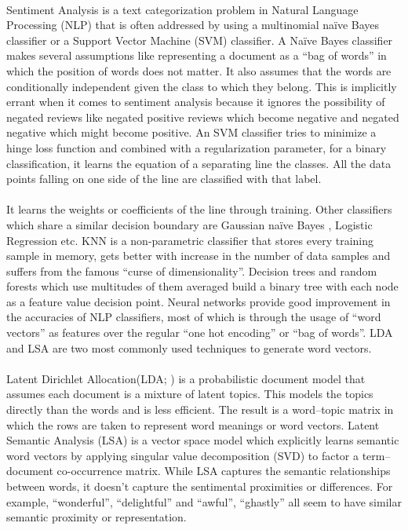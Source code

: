 \documentclass[11pt, oneside]{article}
\begin{document}
\paragraph{}
Sentiment Analysis is a text categorization problem in Natural Language Processing (NLP) that is often addressed by using a multinomial naïve Bayes classifier or a Support Vector Machine (SVM) classifier. A Naïve Bayes classifier makes several assumptions like representing a document as a “bag of words” in which the position of words does not matter. It also assumes that the words are conditionally independent given the class to which they belong. This is implicitly errant when it comes to sentiment analysis because it ignores the possibility of negated reviews like negated positive reviews which become negative and negated negative which might become positive. An SVM classifier tries to minimize a hinge loss function and combined with a regularization parameter, for a binary classification, it learns the equation of a separating line the classes. All the data points falling on one side of the line are classified with that label.
\paragraph{}
It learns the weights or coefficients of the line through training. Other classifiers which share a similar decision boundary are Gaussian naïve Bayes , Logistic Regression etc. KNN is a non-parametric classifier that stores every training sample in memory, gets better with increase in the number of data samples and suffers from the famous “curse of dimensionality”. Decision trees and random forests which use multitudes of them averaged build a binary tree with each node as a feature value decision point.
Neural networks provide good improvement in the accuracies of NLP classifiers, most of which is through the usage of “word vectors” as features over the regular “one hot encoding” or “bag of words”. LDA and LSA are two most commonly used techniques to generate word vectors.
\paragraph{}
Latent Dirichlet Allocation(LDA; \cite{blei2003latent}) is a probabilistic document model that assumes each document is a mixture of latent topics. This models the topics directly than the words and is less efficient. The result is a word–topic matrix in which the rows are taken to represent word meanings or word vectors. Latent Semantic Analysis (LSA) is a vector space model which explicitly learns semantic word vectors by applying singular value decomposition (SVD) to factor a term–document co-occurrence matrix. While LSA captures the semantic relationships between words, it doesn’t capture the sentimental proximities or differences. For example, ``wonderful'', ``delightful'' and ``awful'', ``ghastly'' all seem to have similar semantic proximity or representation.
\end{document}
